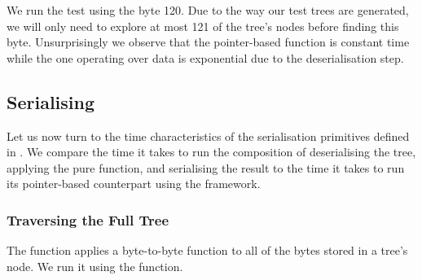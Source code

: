 \smallskip\noindent
\begin{minipage}{.5\textwidth}
\end{minipage}\hfill
\begin{minipage}{.45\textwidth}
\end{minipage}\smallskip

We run the test using the byte 120.
%
Due to the way our test trees are generated, we will only need to
explore at most 121 of the tree's nodes before finding this byte.
%
Unsurprisingly we observe that the pointer-based function is
constant time while the one operating over data is exponential
due to the deserialisation step.



\subsection{Serialising}

Let us now turn to the time characteristics of the serialisation primitives
defined in .
%
We compare the time it takes to run the composition of deserialising
the tree, applying the pure function, and serialising the result
to the time it takes to run its pointer-based counterpart using the
 framework.

\subsubsection{Traversing the Full Tree}

The  function applies a byte-to-byte function
to all of the bytes stored in a tree's node.
%
We run it using the \IdrisKeyword{(}\IdrisFunction{+} \IdrisKeyword{)}
function.

\noindent
\begin{minipage}{.5\textwidth}
\end{minipage}\hfill
\begin{minipage}{.45\textwidth}
\end{minipage}

